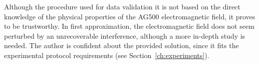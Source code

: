 Although the procedure used for data validation it is not based on the direct 
knowledge of the physical properties of the AG500 electromagnetic field, it 
proves to be trustworthy.
In first approximation, the electromagnetic field does not seem perturbed 
by an unrecoverable interference, although a more in-depth study is needed.
The author is confident about the provided solution, since it fits 
the experimental protocol requirements (see Section~\ref{ch:experiments}).
